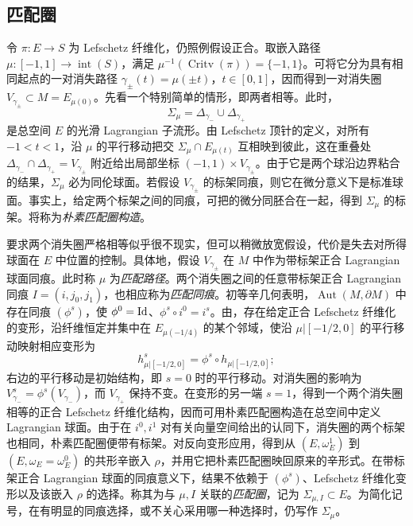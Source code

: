\subsection{匹配圈}\label{sec:16g}
令 $\pi:E\to S$ 为 Lefschetz 纤维化，仍照例假设正合。取嵌入路径 $\mu:[-1,1]\to\operatorname{int}(S)$，满足 $\mu^{-1}(\operatorname{Critv}(\pi))=\{-1,1\}$。可将它分为具有相同起点的一对消失路径 $\gamma_\pm(t)=\mu(\pm t)$，$t\in[0,1]$，因而得到一对消失圈 $V_{\gamma_\pm}\subset M=E_{\mu(0)}$。先看一个特别简单的情形，即两者相等。此时，
\begin{equation}\label{eq:16.8}
\Sigma_\mu=\Delta_{\gamma_-}\cup\Delta_{\gamma_+}
\end{equation}
是总空间 $E$ 的光滑 Lagrangian 子流形。由 Lefschetz 顶针的定义，对所有 $-1<t<1$，沿 $\mu$ 的平行移动把交 $\Sigma_\mu\cap E_{\mu(t)}$ 互相映到彼此，这在重叠处 $\Delta_{\gamma_-}\cap\Delta_{\gamma_+}=V_{\gamma_\pm}$ 附近给出局部坐标 $(-1,1)\times V_{\gamma_\pm}$。由于它是两个球沿边界粘合的结果，$\Sigma_\mu$ 必为同伦球面。若假设 $V_{\gamma_\pm}$ 的标架同痕，则它在微分意义下是标准球面。事实上，给定两个标架之间的同痕，可把的微分同胚合在一起，得到 $\Sigma_\mu$ 的标架。将称为\emph{朴素匹配圈构造}。

要求两个消失圈严格相等似乎很不现实，但可以稍微放宽假设，代价是失去对所得球面在 $E$ 中位置的控制。具体地，假设 $V_{\gamma_\pm}$ 在 $M$ 中作为带标架正合 Lagrangian 球面同痕。此时称 $\mu$ 为\emph{匹配路径}。两个消失圈之间的任意带标架正合 Lagrangian 同痕 $I=(i,j_0,j_1)$，也相应称为\emph{匹配同痕}。初等辛几何表明，$\operatorname{Aut}(M,\partial M)$ 中存在同痕 $(\phi^s)$，使 $\phi^0=\operatorname{Id}$、$\phi^s\circ i^0=i^s$。由，存在给定正合 Lefschetz 纤维化的变形，沿纤维恒定并集中在 $E_{\mu(-1/4)}$ 的某个邻域，使沿 $\mu|[-1/2,0]$ 的平行移动映射相应变形为
\[
h_{\mu|[-1/2,0]}^s=\phi^s\circ h_{\mu|[-1/2,0]};
\]
右边的平行移动是初始结构，即 $s=0$ 时的平行移动。对消失圈的影响为 $V_{\gamma_-}^s=\phi^s(V_{\gamma_-})$，而 $V_{\gamma_+}$ 保持不变。在变形的另一端 $s=1$，得到一个两个消失圈相等的正合 Lefschetz 纤维化结构，因而可用朴素匹配圈构造在总空间中定义
Lagrangian 球面。由于在 $i^0,i^1$ 对有关向量空间给出的认同下，消失圈的两个标架也相同，朴素匹配圈便带有标架。对反向变形应用，得到从 $(E,\omega_E^1)$ 到 $(E,\omega_E=\omega_E^0)$ 的共形辛嵌入 $\rho$，并用它把朴素匹配圈映回原来的辛形式。在带标架正合 Lagrangian 球面的同痕意义下，结果不依赖于 $(\phi^s)$、Lefschetz 纤维化变形以及该嵌入 $\rho$ 的选择。称其为与 $\mu,I$ 关联的\emph{匹配圈}，记为 $\Sigma_{\mu,I}\subset E$。为简化记号，在有明显的同痕选择，或不关心采用哪一种选择时，仍写作 $\Sigma_\mu$。

